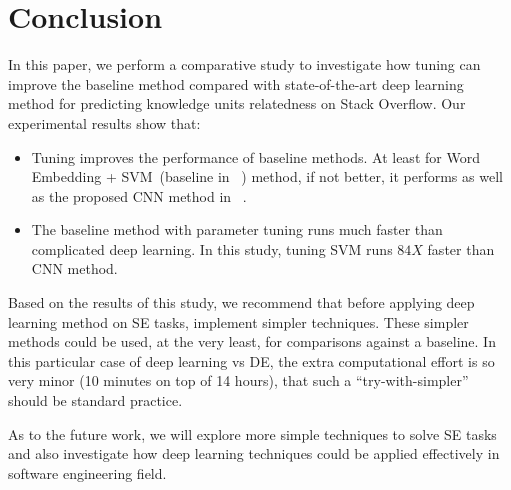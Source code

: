 \documentclass[sigconf]{acmart}
\theoremstyle{break}
\newcommand{\bi}{\begin{itemize}[leftmargin=0.4cm]}
\newcommand{\ei}{\end{itemize}}
\begin{document}
\section{Conclusion}\label{conclusion}

In this paper, we perform a comparative study to investigate
how tuning can improve the baseline method compared with
 state-of-the-art deep learning method  for predicting
knowledge units relatedness on Stack Overflow. Our experimental
results show that:

\bi
\item Tuning improves the performance of baseline methods. 
At least for Word Embedding + SVM~(baseline in ~\cite{xu2016predicting}) method, if not better,
it performs as well as the proposed CNN method in ~\cite{xu2016predicting}.
\item The baseline method with parameter tuning runs much faster than complicated deep learning.
In this study, tuning SVM runs $84X$ faster than CNN method.
\ei



Based on the results of this study, we recommend that before applying 
deep learning method on SE tasks, implement
  simpler techniques.
  These simpler methods could be used,
  at the very least, for comparisons against a baseline.
  In this particular case of deep learning vs DE, the extra computational effort  is so very minor (10 minutes on top of 14 hours), 
  that such a ``try-with-simpler'' should
  be standard practice.
  

As to the future work, we will explore more simple techniques to solve SE tasks and also
investigate how deep learning techniques could be applied effectively in software engineering
field. 





\balance
 
\end{document}
